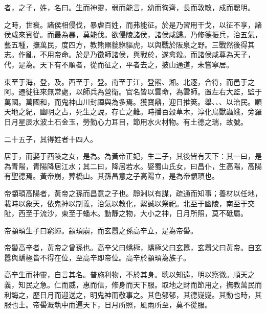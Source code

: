 
\begin{pinyinscope}
者，之子，姓，名曰。生而神靈，弱而能言，幼而徇齊，長而敦敏，成而聰明。

之時，世衰。諸侯相侵伐，暴虐百姓，而弗能征。於是乃習用干戈，以征不享，諸侯咸來賓從。而最為暴，莫能伐。欲侵陵諸侯，諸侯咸歸。乃修德振兵，治五氣，藝五種，撫萬民，度四方，教熊羆貔貅貙虎，以與戰於阪泉之野。三戰然後得其志。作亂，不用帝命。於是乃徵師諸侯，與戰於，遂禽殺。而諸侯咸尊為天子，代，是為。天下有不順者，從而征之，平者去之，披山通道，未嘗寧居。

東至于海，登，及。西至于，登。南至于江，登熊、湘。北逐，合符，而邑于之阿。遷徙往來無常處，以師兵為營衛。官名皆以雲命，為雲師。置左右大監，監于萬國。萬國和，而鬼神山川封禪與為多焉。獲寶鼎，迎日推筴。舉、、、以治民。順天地之紀，幽明之占，死生之說，存亡之難。時播百穀草木，淳化鳥獸蟲蛾，旁羅日月星辰水波土石金玉，勞勤心力耳目，節用水火材物。有土德之瑞，故號。

二十五子，其得姓者十四人。

居于，而娶于西陵之女，是為。為黃帝正妃，生二子，其後皆有天下：其一曰，是為青陽，青陽降居江水；其二曰，降居若水。娶蜀山氏女，曰昌仆，生高陽，高陽有聖德焉。黃帝崩，葬橋山。其孫昌意之子高陽立，是為帝顓頊也。

帝顓頊高陽者，黃帝之孫而昌意之子也。靜淵以有謀，疏通而知事；養材以任地，載時以象天，依鬼神以制義，治氣以教化，絜誠以祭祀。北至于幽陵，南至于交阯，西至于流沙，東至于蟠木。動靜之物，大小之神，日月所照，莫不砥屬。

帝顓頊生子曰窮蟬。顓頊崩，而玄囂之孫高辛立，是為帝嚳。

帝嚳高辛者，黃帝之曾孫也。高辛父曰蟜極，蟜極父曰玄囂，玄囂父曰黃帝。自玄囂與蟜極皆不得在位，至高辛即帝位。高辛於顓頊為族子。

高辛生而神靈，自言其名。普施利物，不於其身。聰以知遠，明以察微。順天之義，知民之急。仁而威，惠而信，修身而天下服。取地之財而節用之，撫教萬民而利誨之，歷日月而迎送之，明鬼神而敬事之。其色郁郁，其德嶷嶷。其動也時，其服也士。帝嚳溉執中而遍天下，日月所照，風雨所至，莫不從服。


\end{pinyinscope}

